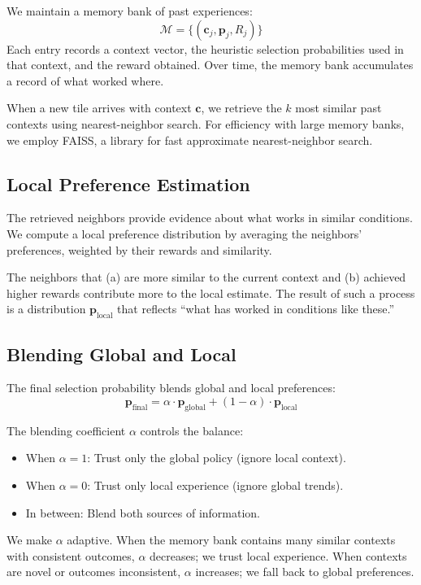 \documentclass[11pt,a4paper]{article}
\begin{document}
We maintain a memory bank of past experiences:
\[
\mathcal{M} = \{(\mathbf{c}_j, \mathbf{p}_j, R_j)\}
\]
Each entry records a context vector, the heuristic selection probabilities used in that context, and the reward obtained. Over time, the memory bank accumulates a record of what worked where.

When a new tile arrives with context $\mathbf{c}$, we retrieve the $k$ most similar past contexts using nearest-neighbor search. For efficiency with large memory banks, we employ FAISS, a library for fast approximate nearest-neighbor search.

\subsection{Local Preference Estimation}

The retrieved neighbors provide evidence about what works in similar conditions. We compute a local preference distribution by averaging the neighbors' preferences, weighted by their rewards and similarity.

The neighbors that (a) are more similar to the current context and (b) achieved higher rewards contribute more to the local estimate. The result of such a process is a distribution $\mathbf{p}_{\text{local}}$ that reflects ``what has worked in conditions like these.''

\subsection{Blending Global and Local}

The final selection probability blends global and local preferences:
\begin{equation}
\mathbf{p}_{\text{final}} = \alpha \cdot \mathbf{p}_{\text{global}} + (1 - \alpha) \cdot \mathbf{p}_{\text{local}}
\label{eq:blending}
\end{equation}

The blending coefficient $\alpha$ controls the balance:
\begin{itemize}
    \item When $\alpha = 1$: Trust only the global policy (ignore local context).
    \item When $\alpha = 0$: Trust only local experience (ignore global trends).
    \item In between: Blend both sources of information.
\end{itemize}

We make $\alpha$ adaptive. When the memory bank contains many similar contexts with consistent outcomes, $\alpha$ decreases; we trust local experience. When contexts are novel or outcomes inconsistent, $\alpha$ increases; we fall back to global preferences.
\end{document}
